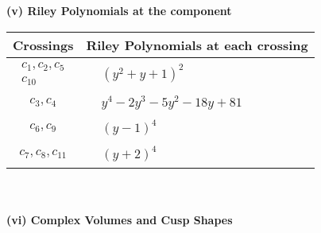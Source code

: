 \documentclass[1p]{elsarticle_modified}
\theoremstyle{definition}
\begin{document}
\newpage\renewcommand{\arraystretch}{1}
\flushleft \textbf{(v) Riley Polynomials at the component}\newline \\
\begin{tabular}{m{50pt}|m{274pt}}
Crossings & \hspace{64pt}Riley Polynomials at each crossing \\
\hline $$\begin{aligned}c_{1},c_{2},c_{5}\\c_{10}\end{aligned}$$&$\begin{aligned}
&(y^2+y+1)^2
\end{aligned}$\\
\hline $$\begin{aligned}c_{3},c_{4}\end{aligned}$$&$\begin{aligned}
&y^4-2 y^3-5 y^2-18 y+81
\end{aligned}$\\
\hline $$\begin{aligned}c_{6},c_{9}\end{aligned}$$&$\begin{aligned}
&(y-1)^4
\end{aligned}$\\
\hline $$\begin{aligned}c_{7},c_{8},c_{11}\end{aligned}$$&$\begin{aligned}
&(y+2)^4
\end{aligned}$\\
\hline
\end{tabular}\\~\\
\newpage\flushleft \textbf{(vi) Complex Volumes and Cusp Shapes}
\end{document}
